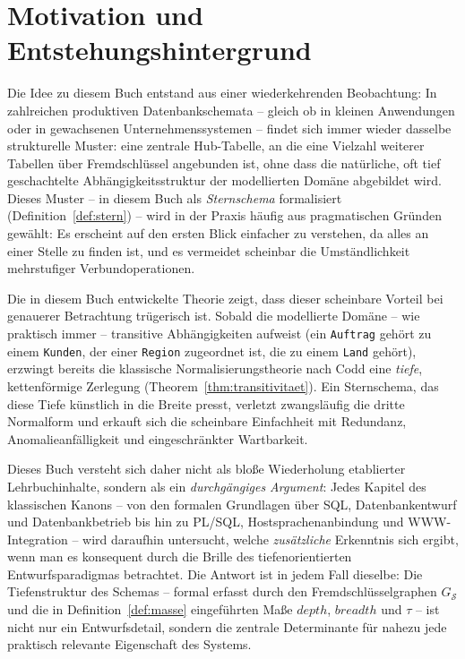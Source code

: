 ﻿\documentclass[a4paper,12pt]{report}
\theoremstyle{definition}
\theoremstyle{remark}
\newcommand{\depth}{\mathit{depth}}
\newcommand{\breadth}{\mathit{breadth}}
\begin{document}
\section*{Motivation und Entstehungshintergrund}

Die Idee zu diesem Buch entstand aus einer wiederkehrenden
Beobachtung: In zahlreichen produktiven Datenbankschemata -- gleich ob
in kleinen Anwendungen oder in gewachsenen Unternehmenssystemen --
findet sich immer wieder dasselbe strukturelle Muster: eine zentrale
\glqq Hub\grqq{}-Tabelle, an die eine Vielzahl weiterer Tabellen über
Fremdschlüssel angebunden ist, ohne dass die natürliche, oft tief
geschachtelte Abhängigkeitsstruktur der modellierten Domäne
abgebildet wird. Dieses Muster -- in diesem Buch als
\emph{Sternschema} formalisiert (Definition~\ref{def:stern}) -- wird
in der Praxis häufig aus pragmatischen Gründen gewählt: Es erscheint
auf den ersten Blick einfacher zu verstehen, da \glqq alles an einer
Stelle\grqq{} zu finden ist, und es vermeidet scheinbar die
\glqq Umständlichkeit\grqq{} mehrstufiger Verbundoperationen.

Die in diesem Buch entwickelte Theorie zeigt, dass dieser scheinbare
Vorteil bei genauerer Betrachtung trügerisch ist. Sobald die
modellierte Domäne -- wie praktisch immer -- transitive
Abhängigkeiten aufweist (ein \texttt{Auftrag} gehört zu einem
\texttt{Kunden}, der einer \texttt{Region} zugeordnet ist, die zu
einem \texttt{Land} gehört), erzwingt bereits die klassische
Normalisierungstheorie nach Codd eine \emph{tiefe}, kettenförmige
Zerlegung (Theorem~\ref{thm:transitivitaet}). Ein Sternschema, das
diese Tiefe künstlich in die Breite presst, verletzt zwangsläufig die
dritte Normalform und erkauft sich die scheinbare Einfachheit mit
Redundanz, Anomalieanfälligkeit und eingeschränkter Wartbarkeit.

Dieses Buch versteht sich daher nicht als bloße Wiederholung
etablierter Lehrbuchinhalte, sondern als ein \emph{durchgängiges
Argument}: Jedes Kapitel des klassischen Kanons -- von den formalen
Grundlagen über SQL, Datenbankentwurf und Datenbankbetrieb bis hin zu
PL/SQL, Hostsprachenanbindung und WWW-Integration -- wird daraufhin
untersucht, welche \emph{zusätzliche} Erkenntnis sich ergibt, wenn man
es konsequent durch die Brille des tiefenorientierten
Entwurfsparadigmas betrachtet. Die Antwort ist in jedem Fall
dieselbe: Die Tiefenstruktur des Schemas -- formal erfasst durch den
Fremdschlüsselgraphen $G_{\mathcal{S}}$ und die in
Definition~\ref{def:masse} eingeführten Maße $\depth$, $\breadth$ und
$\tau$ -- ist nicht nur ein Entwurfsdetail, sondern die zentrale
Determinante für nahezu jede praktisch relevante Eigenschaft des
Systems.
\end{document}
